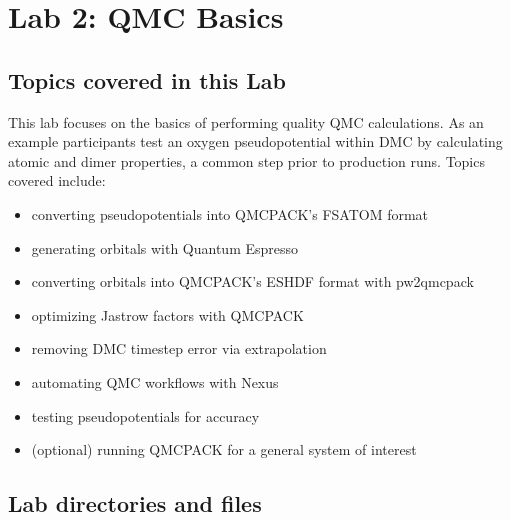 \chapter{Lab 2: QMC Basics}
\label{chap:lab_qmc_basics}



\section{Topics covered in this Lab}
This lab focuses on the basics of performing quality QMC calculations.  As an example participants test an oxygen pseudopotential within DMC by calculating atomic and dimer properties, a common step prior to production runs.  Topics covered include:
\begin{itemize}
  \item{converting pseudopotentials into QMCPACK's FSATOM format}
  \item{generating orbitals with Quantum Espresso}
  \item{converting orbitals into QMCPACK's ESHDF format with pw2qmcpack}
  \item{optimizing Jastrow factors with QMCPACK}
  \item{removing DMC timestep error via extrapolation}
  \item{automating QMC workflows with Nexus}
  \item{testing pseudopotentials for accuracy}
  \item{(optional) running QMCPACK for a general system of interest}
\end{itemize}



\newpage
\section{Lab directories and files}

